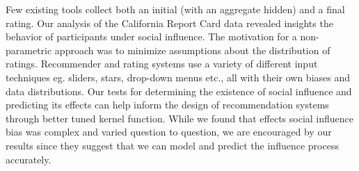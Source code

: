 Few existing tools collect both an initial (with an aggregate hidden) and a final rating.
Our analysis of the California Report Card data revealed insights the behavior of participants under social influence. 
The motivation for a non-parametric approach was to minimize assumptions about the distribution of ratings.
Recommender and rating systems use a variety of different input techniques eg. sliders, stars, drop-down menus etc., all with their own biases and data distributions.
Our tests for determining the existence of social influence and predicting its effects can help inform the design of recommendation systems through better tuned kernel function.
While we found that effects social influence bias was complex and varied question to question, we are encouraged by our results since they suggest that we can model and predict the influence process accurately.

